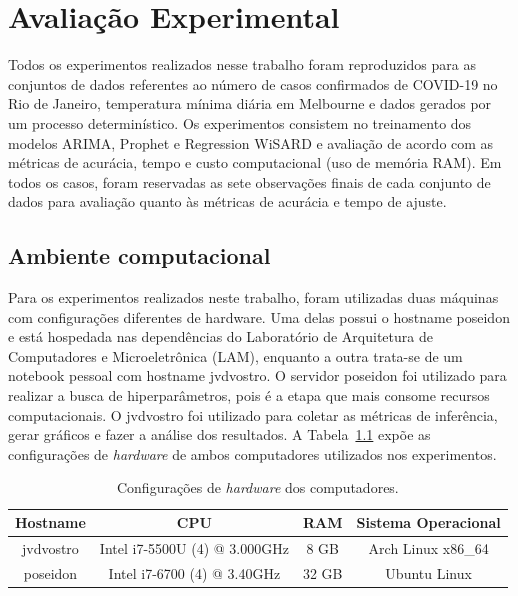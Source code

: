 \chapter{Avaliação Experimental}\label{chap:05}

Todos os experimentos realizados nesse trabalho foram reproduzidos para as conjuntos de dados referentes ao número de casos confirmados de COVID-19 no Rio de Janeiro, temperatura mínima diária em Melbourne e dados gerados por um processo determinístico. Os experimentos consistem no treinamento dos modelos ARIMA, Prophet e Regression WiSARD e avaliação de acordo com as métricas de acurácia, tempo e custo computacional (uso de memória RAM). Em todos os casos, foram reservadas as sete observações finais de cada conjunto de dados para avaliação quanto às métricas de acurácia e tempo de ajuste.

\section{Ambiente computacional}
Para os experimentos realizados neste trabalho, foram utilizadas duas máquinas com configurações diferentes de hardware. Uma delas possui o hostname poseidon e está hospedada nas dependências do Laboratório de Arquitetura de Computadores e Microeletrônica (LAM), enquanto a outra trata-se de um notebook pessoal com hostname jvdvostro. O servidor poseidon foi utilizado para realizar a busca de hiperparâmetros, pois é a etapa que mais consome recursos computacionais. O jvdvostro foi utilizado para coletar as métricas de inferência, gerar gráficos e fazer a análise dos resultados. A Tabela~\ref{tab:hardware} expõe as configurações de \textit{hardware} de ambos computadores utilizados nos experimentos.

\begin{table}[!htp]
    \caption{Configurações de \textit{hardware} dos computadores.}\label{tab:hardware}
    \centering
    \begin{tabular}{@{}cccc@{}}\toprule
        Hostname  & CPU                           & RAM   & Sistema Operacional \\ \midrule
        jvdvostro & Intel i7-5500U (4) @ 3.000GHz & 8 GB  & Arch Linux x86\_64  \\
        poseidon  & Intel i7-6700 (4) @ 3.40GHz   & 32 GB & Ubuntu Linux        \\ \bottomrule
    \end{tabular}
\end{table}

